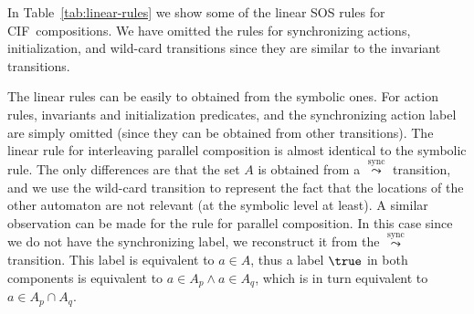 \documentclass[submission,copyright,creativecommons,sharealike]{eptcs}
\newcommand{\CIF}{{CIF}}
\newcommand{\saof}[0]{
\ensuremath{\stackrel {\mathrm{sync}} {\leadsto}}
}
\begin{document}
In Table~\ref{tab:linear-rules} we show some of the linear SOS rules for
\CIF\ compositions. We have omitted the rules for synchronizing
actions, initialization, and wild-card transitions since they are
similar to the invariant transitions.

The linear rules can be easily to obtained from the symbolic
  ones. For action rules, invariants and initialization predicates,
and the synchronizing action label are simply omitted (since they can
be obtained from other transitions). The linear rule for
interleaving parallel composition is almost identical to the symbolic
rule. The only differences are that the set $A$ is obtained from a
$\saof$ transition, and we use the wild-card transition to represent
the fact that the locations of the other automaton are not relevant
(at the symbolic level at least).
A similar observation can be made for the rule for parallel
composition. In this case since we do not have the synchronizing
label, we reconstruct it from the $\saof$ transition. This label is
equivalent to $a \in A$, thus a label $\true$ in both components
is equivalent to $a \in A_p \wedge a \in A_q$, which is in turn equivalent
to $a \in A_p \cap A_q$.
\end{document}
